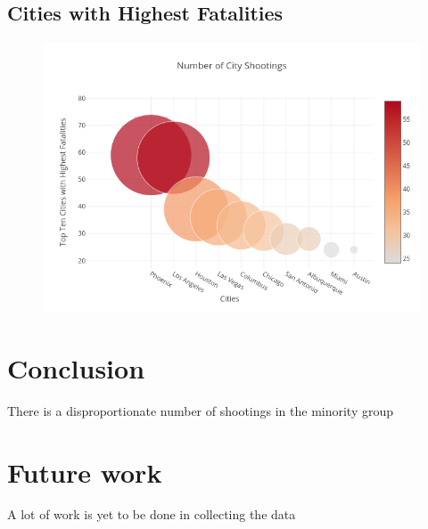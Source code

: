 \documentclass[a4paper,12pt]{article}
\begin{document}
\subsection{Cities with Highest Fatalities}

\begin{figure}[hbt!]
    \centering
    \includegraphics[width=1.0\textwidth]{Number_of_city_shootings.png}
    \caption{}
\end{figure}
\FloatBarrier

\section{Conclusion}
There is a disproportionate number of shootings in the minority group
\section{Future work}
A lot of work is yet to be done in collecting the data



\end{document}
